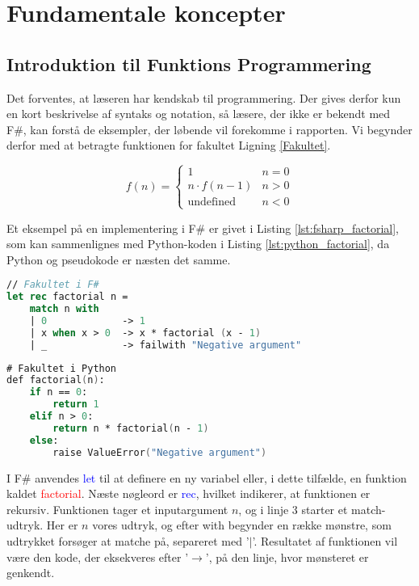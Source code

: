 
\section{Fundamentale koncepter}
\subsection{Introduktion til Funktions Programmering}
Det forventes, at læseren har kendskab til programmering. Der gives derfor kun en kort beskrivelse af syntaks og notation, så læsere, der ikke er bekendt med F\#, kan forstå de eksempler, der løbende vil forekomme i rapporten. Vi begynder derfor med at betragte funktionen for fakultet Ligning \eqref{Fakultet}.

\begin{equation}
    \label{Fakultet}
    f(n) = \begin{cases} 
            1 &  n = 0  \\
            n \cdot f(n-1) & n > 0 \\
            \text{undefined} & n < 0 
           \end{cases}
\end{equation}

Et eksempel på en implementering i F\# er givet i Listing \ref{lst:fsharp_factorial}, som kan sammenlignes med Python-koden i Listing \ref{lst:python_factorial}, da Python og pseudokode er næsten det samme.


\begin{lstlisting}[language={FSharp}, label={lst:fsharp_factorial}, caption={Eksempel på Fakultet i F\#}]
// Fakultet i F#
let rec factorial n =
    match n with
    | 0             -> 1 
    | x when x > 0  -> x * factorial (x - 1)
    | _             -> failwith "Negative argument"
\end{lstlisting}

\begin{lstlisting}[language={FSharp}, label={lst:python_factorial}, caption={Eksempel på Fakultet i Python}]
# Fakultet i Python
def factorial(n):
    if n == 0:
        return 1
    elif n > 0:
        return n * factorial(n - 1)
    else:
        raise ValueError("Negative argument")
\end{lstlisting}

I F\# anvendes \textcolor{blue}{let} til at definere en ny variabel eller, i dette tilfælde, en funktion kaldet \textcolor{red}{factorial}. Næste nøgleord er \textcolor{blue}{rec}, hvilket indikerer, at funktionen er rekursiv. Funktionen tager et inputargument \(n\), og i linje 3 starter et match-udtryk. Her er \(n\) vores udtryk, og efter \textcolor{codepurple}{with} begynder en række mønstre, som udtrykket forsøger at matche på, separeret med '\(\vert\)'. Resultatet af funktionen vil være den kode, der eksekveres efter '\(\rightarrow\)', på den linje, hvor mønsteret er genkendt.
    
